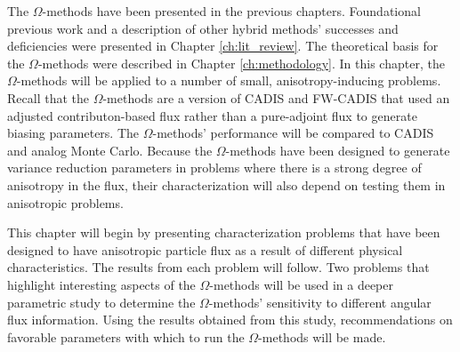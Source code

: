 The $\Omega$-methods have been presented in the previous chapters.
Foundational previous work and a description of other hybrid methods' successes
and deficiencies were presented in Chapter \ref{ch:lit_review}. The
theoretical basis for the $\Omega$-methods were described in Chapter
\ref{ch:methodology}. In this chapter, the $\Omega$-methods will be applied to a
number of small, anisotropy-inducing problems. Recall that the $\Omega$-methods
are a version of CADIS and FW-CADIS that used an adjusted contributon-based flux
rather than a pure-adjoint flux to generate biasing parameters.
The $\Omega$-methods' performance
will be compared to CADIS and analog Monte Carlo.
Because the $\Omega$-methods have been designed to generate variance reduction
parameters in problems
where there is a strong degree of anisotropy in the flux, their
characterization will also depend on testing them in anisotropic
problems.

This chapter will begin by presenting characterization problems
that have been designed to have anisotropic particle flux as a result of
different physical characteristics. The results from each problem will follow. Two problems that highlight interesting
aspects of the $\Omega$-methods will be used in a deeper parametric study to
determine the $\Omega$-methods' sensitivity to different angular flux
information. Using the results obtained from this study,
recommendations on favorable
parameters with which to run the $\Omega$-methods will be made. \\

